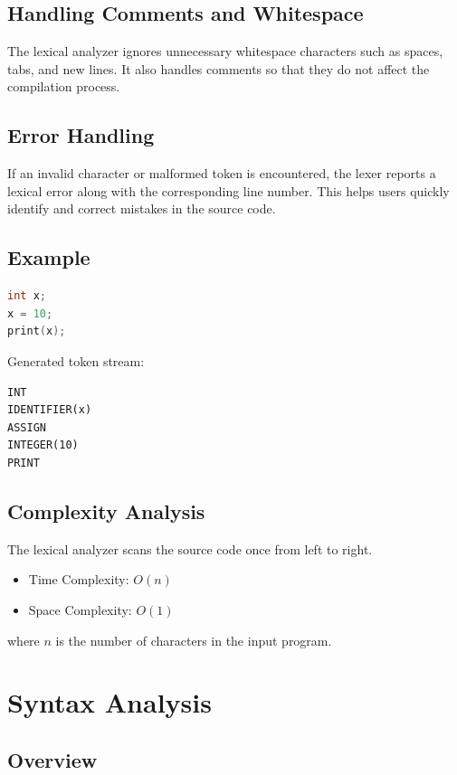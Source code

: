 \documentclass[12pt,a4paper]{report}
\begin{document}
\section{Handling Comments and Whitespace}

The lexical analyzer ignores unnecessary whitespace characters such as spaces, tabs, and new lines. It also handles comments so that they do not affect the compilation process.

\section{Error Handling}

If an invalid character or malformed token is encountered, the lexer reports a lexical error along with the corresponding line number. This helps users quickly identify and correct mistakes in the source code.

\section{Example}

\begin{lstlisting}[language=C]
int x;
x = 10;
print(x);
\end{lstlisting}

Generated token stream:

\begin{lstlisting}
INT
IDENTIFIER(x)
ASSIGN
INTEGER(10)
PRINT
\end{lstlisting}

\section{Complexity Analysis}

The lexical analyzer scans the source code once from left to right.

\begin{itemize}
    \item Time Complexity: \(O(n)\)
    \item Space Complexity: \(O(1)\)
\end{itemize}

where \(n\) is the number of characters in the input program.

\chapter{Syntax Analysis}

\section{Overview}
\end{document}
